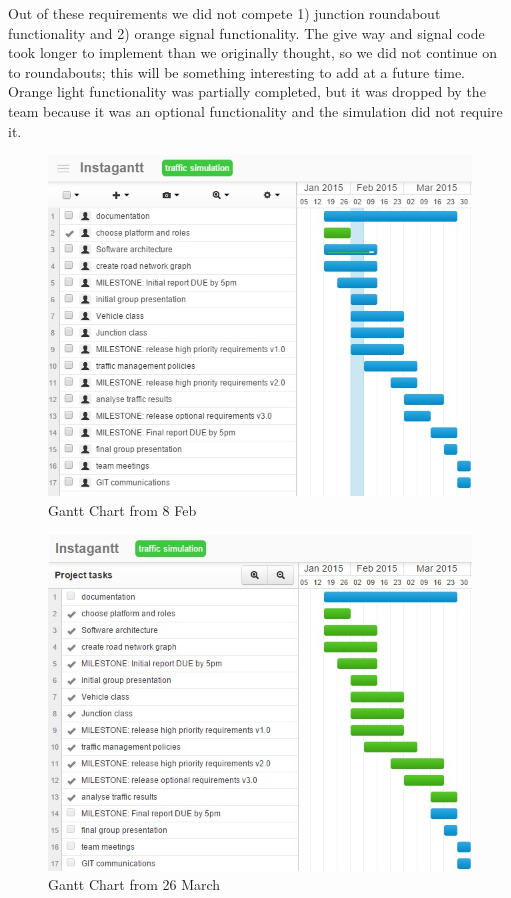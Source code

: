 \documentclass[11pt]{article}
\begin{document}
\begin{enumerate}
Out of these requirements we did not compete 1) junction roundabout functionality and 2) orange signal functionality. The give way and signal code took longer to implement than we originally thought, so we did not continue on to roundabouts; this will be something interesting to add at a future time. Orange light functionality was partially completed, but it was dropped by the team because it was an optional functionality and the simulation did not require it.


\begin{figure}
\begin{center}
\includegraphics[scale=0.7]{gantt8Feb}
\caption{Gantt Chart from 8 Feb}
\end{center}
\end{figure}

\begin{figure}
\begin{center}
\includegraphics[scale=0.6]{gantt26Mar}
\caption{Gantt Chart from 26 March}
\end{center}
\end{figure}
\\



\end{enumerate}
\end{document}
